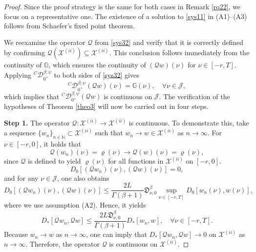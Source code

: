 \documentclass[10pt,a4paper]{amsart}
\numberwithin{equation}{section}
\begin{document}
\begin{proof}
Since the proof strategy is the same for both cases in Remark \ref{rq22}, 
we focus on a representative one. 
The existence of a solution to \eqref{sys11} in (A1)--(A3) follows from 
Schaefer's fixed point theorem.

We reexamine the operator $\mathcal{Q}$ from \eqref{sys32} and verify that it is 
correctly defined by confirming 
$\mathcal{Q}(\mathcal{X}^{(ii)}) \subseteq \mathcal{X}^{(ii)}$. 
This conclusion follows immediately from the continuity of $\mathbb{G}$, which ensures 
the continuity of $(\mathcal{Q} w)(\nu )$ for $\nu \in [- r, T]$.
Applying \({}^C \mathcal{D}_{0^{+}}^{\beta ; \psi}\) to both sides of \eqref{sys32} gives
\[
{}^C \mathcal{D}_{0^{+}}^{\beta ; \psi}(\mathcal{Q} w)(\nu ) 
= \mathbb{G}(\nu ), \quad \forall \nu \in \mathcal{J},
\]
which implies that \({}^C \mathcal{D}_{0^{+}}^{\beta ; \psi}(\mathcal{Q} w)\) 
is continuous on \(\mathcal{J}\).
The verification of the hypotheses of Theorem \ref{theo3} will now be carried out 
in four  steps.
\smallskip

\noindent\textbf{Step 1.} The operator \(\mathcal{Q} : \mathcal{X}^{(ii)} 
\to \mathcal{X}^{(ii)}\) is continuous. To demonstrate this, take a sequence 
\(\{ w_n\}_{n \in \mathbb{N}} \subset \mathcal{X}^{(ii)}\) such that
 \( w_n \to w \in \mathcal{X}^{(ii)}\) as 
\(n \to \infty\). For \( \nu \in [- r, 0] \), it holds that
\[
\mathcal{Q}( w_n)(\nu ) = \varrho(\nu ) \to \mathcal{Q}( w)(\nu ) = \varrho(\nu ),
\]
since \(\mathcal{Q}\) is defined to yield \(\varrho(\nu )\) for all functions 
in \(\mathcal{X}^{(ii)}\) on \([- r, 0]\).
$$
D_0[(\mathcal{Q} w_{n})(\nu ),(\mathcal{Q} w)(\nu )]=0,
$$
and for any $\nu \in\mathcal{J}$, one also obtains
$$
D_0[(\mathcal{Q} w_{n})(\nu ),(\mathcal{Q} w)(\nu )]
\leq  \frac{2L}{\Gamma(\beta+1)}\mathfrak{D}_{\nu ,0}^{\beta} \sup _{\nu \in[- r, T]} D_0[ w_{n}(\nu ), w(\nu )],
$$
where we use assumption (A2). Hence, it yields
$$
D_{*}[\mathcal{Q} w_{n}, \mathcal{Q} w] 
\leq \frac{2L\mathfrak{D}_{\nu ,0}^{\beta} }{\Gamma(\beta+1)}D_{*}[ w_{n}, w], 
\quad \forall \nu \in[- r, T] .
$$
Because $ w_{n} \to w$ as $n \to \infty$, one can imply that 
$D_{*}[\mathcal{Q} w_{n}, \mathcal{Q} w] \to 0$ on $\mathcal{X}^{(ii)}$ as 
$n \to \infty$. Therefore, the operator $\mathcal{Q}$ is continuous on 
$\mathcal{X}^{(ii)}$.
\smallskip


\end{proof}
\end{document}
